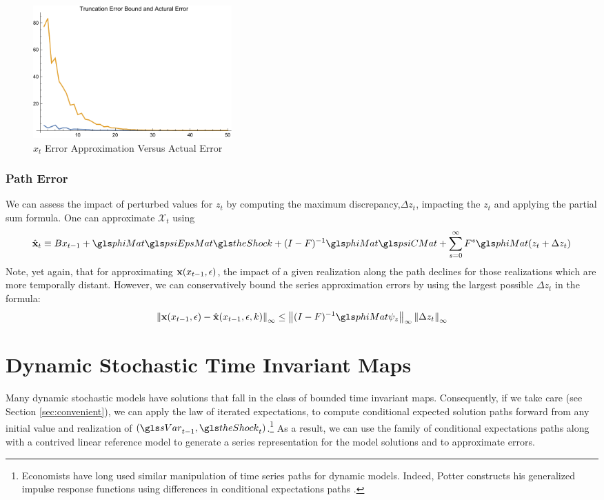 \documentclass[12pt]{article}
\begin{document}
\begin{figure}
  \centering


\includegraphics[width=3in]{arbTruncErr.pdf}  
  \caption{$x_t$ Error Approximation Versus Actual Error} \label{figArbTrunc}

\end{figure}

\subsubsection{Path Error}


We can assess the impact of perturbed values for $z_t$ by computing the maximum discrepancy,$\Delta z_t$, impacting the $z_t$ and applying the 
partial sum formula.
One can  approximate $\mathcal{X}_t$ using
 	 \begin{gather}
 	 \xWOargK_t \equiv B x_{t-1}+ \phiMat \psiEpsMat\theShock  + (I - F)^{-1} \phiMat \psiCMat + \sum_{s=0}^\infty F^s \phiMat (z_{t}+\Delta z_{t})\label{theDeltaSeries}
 \end{gather}
Note, yet again, that for approximating $\mathbf{x}(x_{t-1},\epsilon)$, the impact of  a given realization along the path declines for those realizations which are  more temporally distant.
However, we can conservatively bound the  series approximation  errors by using the largest possible $\Delta z_t$ in the formula:
    \begin{gather}
\infNorm{\xWarg-\xWargK} \le \infNorm{(I -F)^{-1} \phiMat \psi_z}  \infNorm{\Delta z_t } \label{pathErr}
    \end{gather}


\label{sec:pathnorm}

\clearpage
\section{Dynamic Stochastic Time Invariant Maps}
\label{sec:extToMaps}

Many dynamic stochastic models have solutions that 
fall in the class of bounded time invariant maps.
Consequently, if we take care (see Section \ref{sec:convenient}), we can apply the law of iterated expectations, 
to compute conditional expected solution paths 
forward from any initial value and realization of $\tArg$.\footnote{Economists have long used similar manipulation of
time series paths for dynamic models. 
Indeed, Potter constructs his generalized impulse response functions using
differences in conditional expectations paths \citep{Potter2000,Koop1996a}.
}
As a result, we can use the family of conditional expectations paths 
along with a contrived linear reference model to generate
a series representation for the model solutions  and
to approximate errors.
\end{document}
